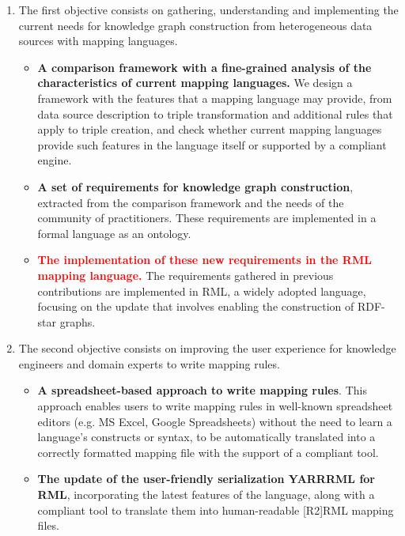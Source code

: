 \begin{enumerate}
    \item The first objective consists on gathering, understanding and implementing the current needs for knowledge graph construction from heterogeneous data sources with mapping languages. 

    \begin{itemize}
        \item \textbf{A comparison framework with a fine-grained analysis of the characteristics of current mapping languages.} We design a framework with the features that a mapping language may provide, from data source description to triple transformation and additional rules that apply to triple creation, and check whether current mapping languages provide such features in the language itself or supported by a compliant engine. 

        \item \textbf{A set of requirements for knowledge graph construction}, extracted from the comparison framework and the needs of the community of practitioners. These requirements are implemented in a formal language as an ontology. 

        \item \textcolor{red}{\textbf{The implementation of these new requirements in the RML mapping language.}} The requirements gathered in previous contributions are implemented in RML, a widely adopted language, focusing on the update that involves enabling the construction of RDF-star graphs.
    \end{itemize}

    \item The second objective consists on improving the user experience for knowledge engineers and domain experts to write mapping rules.

    \begin{itemize}
        \item \textbf{A spreadsheet-based approach to write mapping rules}. This approach enables users to write mapping rules in well-known spreadsheet editors (e.g. MS Excel, Google Spreadsheets) without the need to learn a language's constructs or syntax, to be automatically translated into a correctly formatted mapping file with the support of a compliant tool. 

        \item \textbf{The update of the user-friendly serialization YARRRML for RML}, incorporating the latest features of the language, along with a compliant tool to translate them into human-readable [R2]RML mapping files. 
    \end{itemize}


\end{enumerate}

